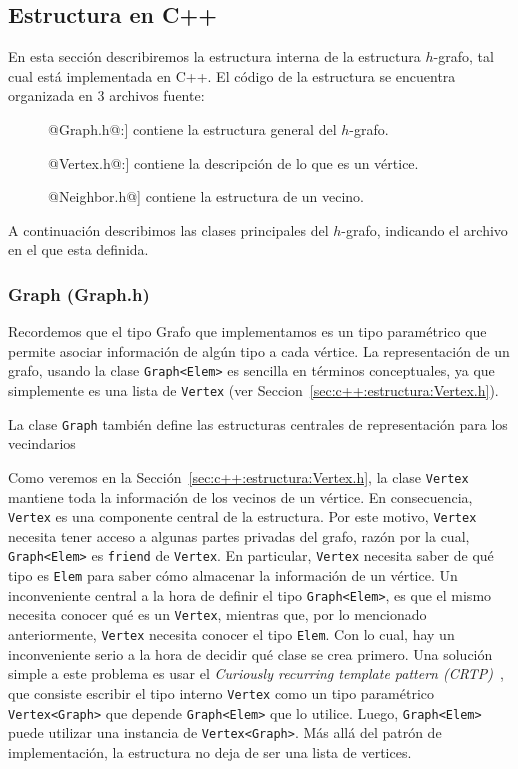 \documentclass[a4paper,12pt]{article}
\makeatletter
\newcommand{\Code}[1]{\lstinline[basicstyle={\tt}]@#1@}
\makeatother
\begin{document}
\subsection{Estructura en C++}
\label{sec:c++:estructura}

En esta sección describiremos la estructura interna de la estructura $h$-grafo, tal cual está implementada en C++.  El código de la estructura se encuentra organizada en 3 archivos fuente:
\begin{description}
  \item[\Code{Graph.h}:] contiene la estructura general del $h$-grafo.
  \item[\Code{Vertex.h}:] contiene la descripción de lo que es un vértice.
  \item[\Code{Neighbor.h}] contiene la estructura de un vecino.
\end{description}
A continuación describimos las clases principales del $h$-grafo, indicando el archivo en el que esta definida.

\subsubsection{Graph (Graph.h)}
\label{sec:c++:estructura:Graph.h}

Recordemos que el tipo Grafo que implementamos es un tipo paramétrico que permite asociar información de algún tipo a cada vértice.  La representación de un grafo, usando la clase \Code{Graph<Elem>} es sencilla en términos conceptuales, ya que simplemente es una lista de \Code{Vertex} (ver Seccion~\ref{sec:c++:estructura:Vertex.h}).  

La clase \Code{Graph} también define las estructuras centrales de representación para los vecindarios


Como veremos en la Sección~\ref{sec:c++:estructura:Vertex.h}, la clase \Code{Vertex} mantiene toda la información de los vecinos de un vértice.  En consecuencia, \Code{Vertex} es una componente central de la estructura.  Por este motivo, \Code{Vertex} necesita tener acceso a algunas partes privadas del grafo, razón por la cual, \Code{Graph<Elem>} es \Code{friend} de \Code{Vertex}.  En particular, \Code{Vertex} necesita saber de qué tipo es \Code{Elem} para saber cómo almacenar la información de un vértice.  Un inconveniente central a la hora de definir el tipo \Code{Graph<Elem>}, es que el mismo necesita conocer qué es un \Code{Vertex}, mientras que, por lo mencionado anteriormente, \Code{Vertex} necesita conocer el tipo \Code{Elem}.  Con lo cual, hay un inconveniente serio a la hora de decidir qué clase se crea primero.  Una solución simple a este problema es usar el \emph{Curiously recurring template pattern (CRTP)}~\cite{}, que consiste escribir el tipo interno \Code{Vertex} como un tipo paramétrico \Code{Vertex<Graph>} que depende \Code{Graph<Elem>} que lo utilice.  Luego, \Code{Graph<Elem>} puede utilizar una instancia de \Code{Vertex<Graph>}.  Más allá del patrón de implementación, la estructura no deja de ser una lista de vertices.
\end{document}

